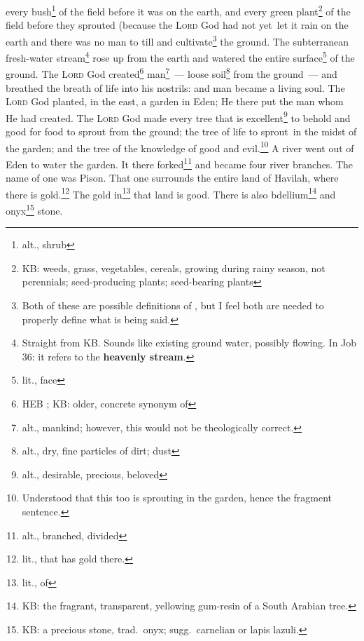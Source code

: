 \begin{inparaenum}
     every bush\footnote{alt., shrub} of the field before it was on the earth, and every green plant\footnote{KB: weeds, grass, vegetables, cereals, growing during rainy season, not perennials; seed-producing plants; seed-bearing plants} of the field before they sprouted (because the \textsc{Lord} God had not yet\understood\ let it rain on the earth and there was no man to till and cultivate\footnote{Both of these are possible definitions of , but I feel both are needed to properly define what is being said.} the ground.%
     The subterranean fresh-water stream\footnote{Straight from KB. Sounds like existing ground water, possibly flowing. In Job 36\thinspace: it refers to the \textbf{heavenly stream}.} rose up from the earth and watered the entire surface\footnote{lit., face} of the ground.%
     The \textsc{Lord} God created\footnote{HEB ; KB: older, concrete synonym of } man\footnote{alt., mankind; however, this would not be theologically correct.}~--- loose soil\footnote{alt., dry, fine particles of dirt; dust} from the ground~--- and breathed the breath of life into his nostrils: and man became a living soul.%
     The \textsc{Lord} God planted, in the east, a garden in Eden; He there put the man whom He had created.%
     The \textsc{Lord} God made every tree that is excellent\footnote{alt., desirable, precious, beloved} to behold and good for food to sprout from the ground; the tree of life to sprout\understood\ in the midst of the garden; and the tree of the knowledge of good and evil.\footnote{Understood that this too is sprouting in the garden, hence the fragment sentence.}%
     A river went out of Eden to water the garden. It there forked\footnote{alt., branched, divided} and became four river branches.%
     The name of one was Pison. That one surrounds the entire land of Havilah, where there is gold.\footnote{lit., that has gold there.}%
     The gold in\footnote{lit., of} that land is good. There is also bdellium\footnote{KB: the fragrant, transparent, yellowing gum-resin of a South Arabian tree.} and onyx\footnote{KB: a precious stone, trad.\ onyx; sugg.\ carnelian or lapis lazuli.} stone.%
    
\end{inparaenum}
